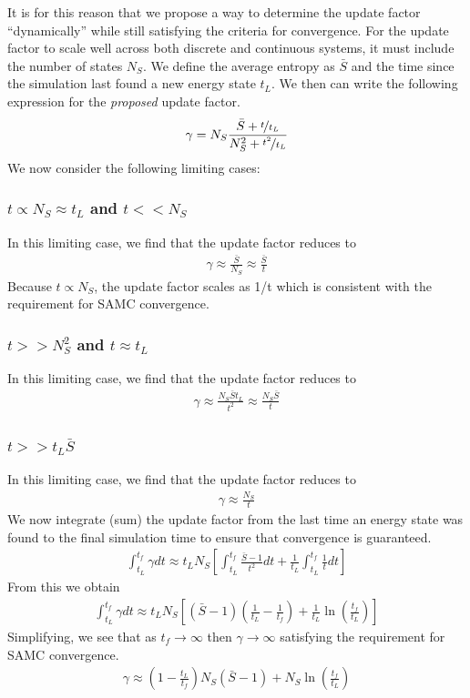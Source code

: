 \documentclass[letterpaper,twocolumn,amsmath,amssymb,pre,aps,10pt]{revtex4-1}
\begin{document}
{\color{red}
It is for this reason that we propose a way to determine the update factor
``dynamically'' while still satisfying the criteria for convergence.
For the update factor to scale well across both discrete and continuous systems,
it must include the number of states $N_S$. We define the average entropy as
$\bar S$ and the time since the simulation last found a new energy state $t_L$.
We then can write the following expression for the \emph{proposed} update factor.
\begin{align}
\gamma = N_S \frac{\bar S + \nicefrac{t}{t_L}}{N_{S}^2 + \nicefrac{t^2}{t_L}}
\end{align}
We now consider the following limiting cases:
\subsubsection{$t \propto N_S \approx t_L$ and $ t << N_S$}
In this limiting case, we find that the update factor reduces to
\begin{align}
\gamma \approx \frac{\bar S}{N_S} \approx \frac{\bar S}{t}
\end{align}
Because $t \propto N_S$, the update factor scales as 1/t which is consistent
with the requirement for SAMC convergence.
\subsubsection{$t >> N_{S}^2$ and $ t\approx t_L$}
In this limiting case, we find that the update factor reduces to
\begin{align}
\gamma \approx \frac{N_S \bar S t_L}{t^2} \approx \frac{N_S \bar S}{t}
\end{align}
\subsubsection{$t >> t_L \bar S$}
In this limiting case, we find that the update factor reduces to
\begin{align}
\gamma \approx \frac{N_S}{t}
\end{align}
We now integrate (sum) the update factor from the last time an energy state was found
to the final simulation time to ensure that convergence is guaranteed.
\begin{align}
\int_{t_L}^{t_f} \gamma dt \approx t_L N_S \left[ \int_{t_L}^{t_f}
\frac{\bar S -1}{t^2} dt + \frac{1}{t_L}\int_{t_L}^{t_f} \frac{1}{t} dt \right]
\end{align}
From this we obtain
\begin{align}
\int_{t_L}^{t_f} \gamma dt \approx t_L N_S \left[\left(\bar S -1\right)\left(\frac{1}{t_L}-\frac{1}{t_f}\right) + \frac{1}{t_L} \ln\left(\frac{t_f}{t_L}\right) \right]
\end{align}
Simplifying, we see that as $t_f \rightarrow \infty$ then $\gamma \rightarrow \infty$ satisfying
the requirement for SAMC convergence.
\begin{align}
\gamma \approx \left(1-\frac{t_L}{t_f}\right)N_S\left(\bar S -1\right) + N_S \ln\left(\frac{t_f}{t_L}\right)
\end{align}
}
\end{document}
